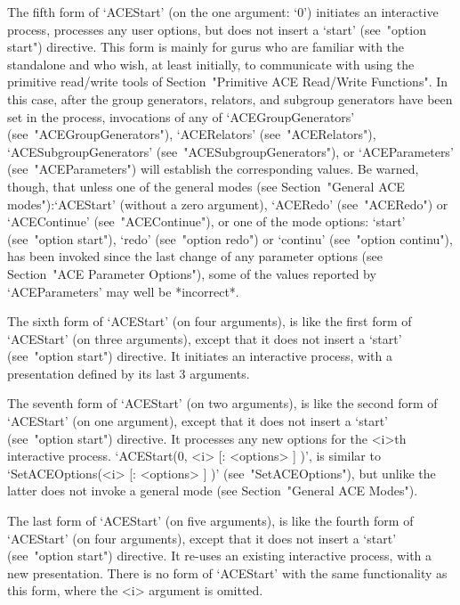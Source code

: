 The fifth form of `ACEStart' (on the one argument: `0')  initiates  an
interactive {\ACE} process, processes any user options, but  does  not
insert a `start' (see~"option start") directive. This form  is  mainly
for gurus who are familiar with the {\ACE} standalone and who wish, at
least initially,  to  communicate  with  {\ACE}  using  the  primitive
read/write tools of  Section~"Primitive ACE Read/Write Functions".  In
this  case,  after  the  group  generators,  relators,  and   subgroup
generators have been set in the {\ACE} process, invocations of any  of
`ACEGroupGenerators'     (see~"ACEGroupGenerators"),     `ACERelators'
(see~"ACERelators"),                           `ACESubgroupGenerators'
(see~"ACESubgroupGenerators"),           or            `ACEParameters'
(see~"ACEParameters") will establish the corresponding {\GAP}  values.
Be warned, though, that unless one of the general  {\ACE}  modes  (see
Section~"General ACE modes"):`ACEStart'  (without  a  zero  argument),
`ACERedo' (see~"ACERedo") or `ACEContinue' (see~"ACEContinue"), or one
of the mode options: `start' (see~"option start"), `redo' (see~"option
redo") or `continu' (see~"option continu"), has been invoked since the
last change of  any  parameter  options  (see  Section~"ACE  Parameter
Options"), some of the values reported by `ACEParameters' may well  be
*incorrect*.

The sixth form of `ACEStart' (on four arguments), is  like  the  first
form of `ACEStart' (on three  arguments),  except  that  it  does  not
insert a `start'  (see~"option  start")  directive.  It  initiates  an
interactive {\ACE} process, with a presentation defined by its last  3
arguments.

The seventh form of `ACEStart' (on two arguments), is like the  second
form of `ACEStart' (on one argument), except that it does not insert a
`start' (see~"option start") directive. It processes any  new  options
for  the  <i>th  interactive  {\ACE}  process.  `ACEStart(0,  <i>   [:
<options> ] )', is similar to `SetACEOptions(<i>  [:  <options>  ]  )'
(see~"SetACEOptions"), but unlike the latter does not invoke a general
mode (see Section~"General ACE Modes").

The last form of `ACEStart' (on five arguments), is  like  the  fourth
form of `ACEStart' (on four arguments), except that it does not insert
a `start' (see~"option  start")  directive.  It  re-uses  an  existing
interactive {\ACE} process, with a new presentation. There is no  form
of `ACEStart' with the same functionality as this form, where the  <i>
argument is omitted.

